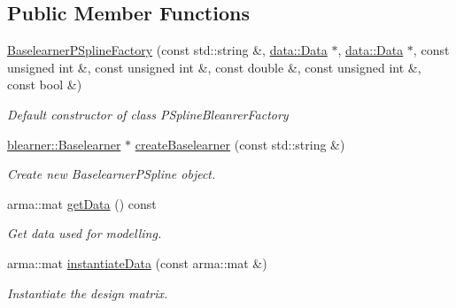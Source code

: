 \subsection*{Public Member Functions}
\begin{DoxyCompactItemize}
\item 
\mbox{\hyperlink{classblearnerfactory_1_1_baselearner_p_spline_factory_a295bad8fb9554cb45a56c8b6c5e8e047}{Baselearner\+P\+Spline\+Factory}} (const std\+::string \&, \mbox{\hyperlink{classdata_1_1_data}{data\+::\+Data}} $\ast$, \mbox{\hyperlink{classdata_1_1_data}{data\+::\+Data}} $\ast$, const unsigned int \&, const unsigned int \&, const double \&, const unsigned int \&, const bool \&)
\begin{DoxyCompactList}\small\item\em Default constructor of class {\ttfamily P\+Spline\+Bleanrer\+Factory} \end{DoxyCompactList}\item 
\mbox{\hyperlink{classblearner_1_1_baselearner}{blearner\+::\+Baselearner}} $\ast$ \mbox{\hyperlink{classblearnerfactory_1_1_baselearner_p_spline_factory_a3f47f46766e8e50eafe824bd97f7fc44}{create\+Baselearner}} (const std\+::string \&)
\begin{DoxyCompactList}\small\item\em Create new {\ttfamily Baselearner\+P\+Spline} object. \end{DoxyCompactList}\item 
arma\+::mat \mbox{\hyperlink{classblearnerfactory_1_1_baselearner_p_spline_factory_a542e3f962314ea7fe46cfe8eed4c4da7}{get\+Data}} () const
\begin{DoxyCompactList}\small\item\em Get data used for modelling. \end{DoxyCompactList}\item 
arma\+::mat \mbox{\hyperlink{classblearnerfactory_1_1_baselearner_p_spline_factory_a8e9f7977906b310d21dda5cceb15c0d8}{instantiate\+Data}} (const arma\+::mat \&)
\begin{DoxyCompactList}\small\item\em Instantiate the design matrix. \end{DoxyCompactList}\end{DoxyCompactItemize}
